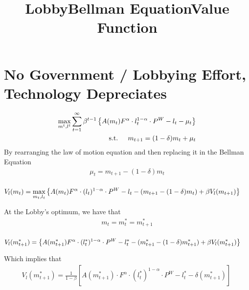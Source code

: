 \documentclass[12pt]{article}
\begin{document}
\section{No Government / Lobbying Effort, Technology Depreciates}

\title{Lobby}

\begin{equation}
\begin{aligned}
\max_{m^t,l^t} \sum_{t=1}^\infty \beta^{t-1}\left\{A(m_t)F^\alpha\cdot l^{1-\alpha}_t\cdot P^W-l_t-\mu_t\right\}\\ 
\text{s.t.} \hskip.2in  m_{t+1}=(1-\delta)m_{t}+\mu_t\\
\end{aligned}
\end{equation}
\[
\]
\normalsize
By rearranging the law of motion equation and then replacing it in the Bellman Equation
\begin{equation}
\begin{aligned}
\mu_t=m_{t+1}-(1-\delta)m_{t}\\
\end{aligned}
\end{equation}

\title{Bellman Equation}
\begin{equation}
\begin{aligned}
 V_l(m_t)=\max_{m_t,l_t}\left\{A(m_t)F^\alpha\cdot (l_t)^{1-\alpha}\cdot P^W-l_t-(m_{t+1}-(1-\delta)m_t)+\beta V_l(m_{t+1})\right\} \hskip.2in 
\end{aligned}
\end{equation}

\normalsize
At the Lobby's optimum, we have that
\begin{equation}
\begin{aligned}
m_t=m_t^\ast=m^\ast_{t+1}\\
\end{aligned}
\end{equation}

\title{Value Function}
\begin{equation}
\begin{aligned}
V_l(m_{t+1}^\ast)=\left\{A(m_{t+1}^\ast)F^\alpha\cdot (l^\ast_t)^{1-\alpha}\cdot P^W-l_t^\ast-(m^\ast_{t+1}-(1-\delta)m^\ast_{t+1})+\beta V_l(m^\ast_{t+1})\right\} \hskip.2in
\end{aligned}
\end{equation}

\normalsize
Which implies that
\begin{equation}
\begin{aligned}
V_l(m_{t+1}^\ast)=\frac{1}{1-\beta}\left[ A(m_{t+1}^\ast)\cdot F^\alpha\cdot (l^\ast_t)^{1-\alpha}\cdot P^W-l^\ast_t-\delta(m^\ast_{t+1})\right]\
\end{aligned}
\end{equation}
\end{document}
